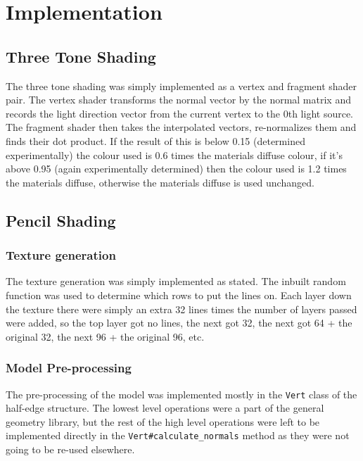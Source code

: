 \section{Implementation}

  \subsection{Three Tone Shading}

    The three tone shading was simply implemented as a vertex and fragment
    shader pair.  The vertex shader transforms the normal vector by the normal
    matrix and records the light direction vector from the current vertex to the
    0th light source.  The fragment shader then takes the interpolated vectors,
    re-normalizes them and finds their dot product.  If the result of this is
    below 0.15 (determined experimentally) the colour used is 0.6 times the
    materials diffuse colour, if it's above 0.95 (again experimentally
    determined) then the colour used is 1.2 times the materials diffuse,
    otherwise the materials diffuse is used unchanged.

  \subsection{Pencil Shading}

    \subsubsection{Texture generation}

      The texture generation was simply implemented as stated.  The inbuilt
      random function was used to determine which rows to put the lines on.
      Each layer down the texture there were simply an extra 32 lines times the
      number of layers passed were added, so the top layer got no lines, the
      next got 32, the next got 64 + the original 32, the next 96 + the original
      96, etc.

    \subsubsection{Model Pre-processing}

      The pre-processing of the model was implemented mostly in the
      \texttt{Vert} class of the half-edge structure.  The lowest level
      operations were a part of the general geometry library, but the rest of
      the high level operations were left to be implemented directly in the
      \texttt{Vert\#calculate\_normals} method as they were not going to be
      re-used elsewhere.

